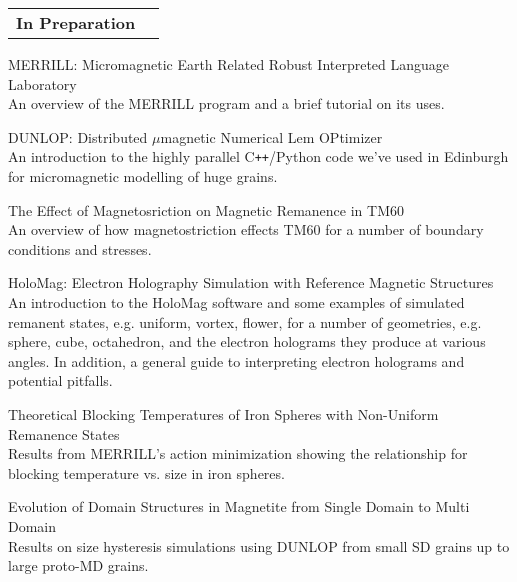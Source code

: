 \documentclass[11pt]{article}
\makeatletter
\newenvironment{resumeSubSectionHeader}{
    \par
    \begin{tabular*}{\textwidth}{l@{\extracolsep{\fill}}r}
    \par
} {
    \end{tabular*}
    \par
}
\newenvironment{resumeSubSectionBody}{
    \par
    \vspace{-0.8\parskip}
    \begin{small}
    \par
} {
    \par
    \end{small}
    \par
}
\makeatother
\begin{document}
%
%
\begin{resumeSubSectionHeader}

    \textbf{In Preparation}

\end{resumeSubSectionHeader}
\begin{resumeSubSectionBody}

    \begin{description}
        \item{
            MERRILL: Micromagnetic Earth Related Robust Interpreted Language
            Laboratory
        }\\
        An overview of the MERRILL program and a brief tutorial on its uses.

        \item{DUNLOP: Distributed $\mu$magnetic Numerical Lem OPtimizer}\\
            An introduction to the highly parallel C\verb!++!/Python code we've
            used in Edinburgh for micromagnetic modelling of huge grains.

        \item{The Effect of Magnetosriction on Magnetic Remanence in TM60}\\
            An overview of how magnetostriction effects TM60 for a number of
            boundary conditions and stresses.

        \item{
            HoloMag: Electron Holography Simulation with Reference Magnetic
            Structures
        }\\
            An introduction to the HoloMag software and some examples of
            simulated remanent states, e.g. uniform, vortex, flower, for a
            number of geometries, e.g. sphere, cube, octahedron, and the
            electron holograms they produce at various angles.
            In addition, a general guide to interpreting electron holograms and
            potential pitfalls.

        \item{
            Theoretical Blocking Temperatures of Iron Spheres with Non-Uniform
            Remanence States
        }\\
            Results from MERRILL's action minimization showing the relationship
            for blocking temperature vs. size in iron spheres.

        \item{
            Evolution of Domain Structures in Magnetite from Single Domain to
            Multi Domain
        }\\
            Results on size hysteresis simulations using DUNLOP from small SD
            grains up to large proto-MD grains.

    \end{description}

\end{resumeSubSectionBody}
\end{document}
